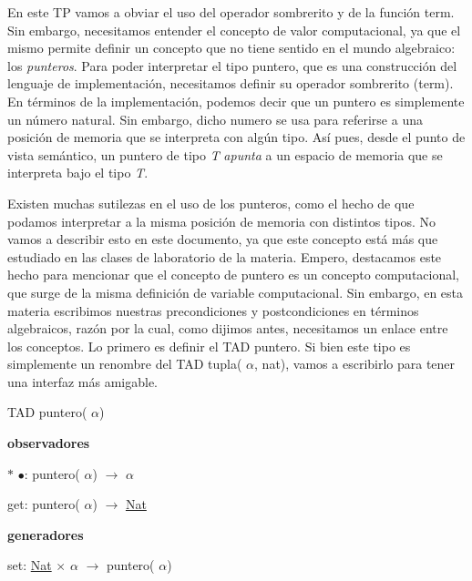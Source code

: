 En este T\-P vamos a obviar el uso del operador sombrerito y de la función term. Sin embargo, necesitamos entender el concepto de valor computacional, ya que el mismo permite definir un concepto que no tiene sentido en el mundo algebraico\-: los {\itshape punteros}. Para poder interpretar el tipo puntero, que es una construcción del lenguaje de implementación, necesitamos definir su operador sombrerito (term). En términos de la implementación, podemos decir que un puntero es simplemente un número natural. Sin embargo, dicho numero se usa para referirse a una posición de memoria que se interpreta con algún tipo. Así pues, desde el punto de vista semántico, un puntero de tipo {\itshape T} {\itshape apunta} a un espacio de memoria que se interpreta bajo el tipo {\itshape T}.

Existen muchas sutilezas en el uso de los punteros, como el hecho de que podamos interpretar a la misma posición de memoria con distintos tipos. No vamos a describir esto en este documento, ya que este concepto está más que estudiado en las clases de laboratorio de la materia. Empero, destacamos este hecho para mencionar que el concepto de puntero es un concepto computacional, que surge de la misma definición de variable computacional. Sin embargo, en esta materia escribimos nuestras precondiciones y postcondiciones en términos algebraicos, razón por la cual, como dijimos antes, necesitamos un enlace entre los conceptos. Lo primero es definir el T\-A\-D puntero. Si bien este tipo es simplemente un renombre del T\-A\-D tupla( $\alpha$, nat), vamos a escribirlo para tener una interfaz más amigable.

T\-A\-D puntero( $\alpha$)\par
{\bfseries observadores} \par

\begin{DoxyItemize}
\item $\ast$ $\bullet$\-: puntero( $\alpha$) $\to$ $\alpha$\par

\item get\-: puntero( $\alpha$) $\to$ \hyperlink{classNat}{Nat}
\end{DoxyItemize}

{\bfseries generadores} \par

\begin{DoxyItemize}
\item set\-: \hyperlink{classNat}{Nat} $\times$ $\alpha$ $\to$ puntero( $\alpha$)
\end{DoxyItemize}

